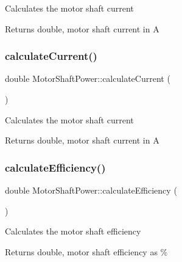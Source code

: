 Calculates the motor shaft current

\begin{DoxyReturn}{Returns}
double, motor shaft current in A 
\end{DoxyReturn}
\mbox{\label{class_motor_shaft_power_a3ce530d426fa14223199d89f54f34244}} 
\subsubsection{\texorpdfstring{calculate\+Current()}{calculateCurrent()}\hspace{0.1cm}{\footnotesize\ttfamily [3/3]}}
{\footnotesize\ttfamily double Motor\+Shaft\+Power\+::calculate\+Current (\begin{DoxyParamCaption}{ }\end{DoxyParamCaption})}

Calculates the motor shaft current

\begin{DoxyReturn}{Returns}
double, motor shaft current in A 
\end{DoxyReturn}
\mbox{\label{class_motor_shaft_power_ab7df0b41dc9d1bc6a591f0ab8f57b7ee}} 
\subsubsection{\texorpdfstring{calculate\+Efficiency()}{calculateEfficiency()}\hspace{0.1cm}{\footnotesize\ttfamily [1/3]}}
{\footnotesize\ttfamily double Motor\+Shaft\+Power\+::calculate\+Efficiency (\begin{DoxyParamCaption}{ }\end{DoxyParamCaption})}

Calculates the motor shaft efficiency

\begin{DoxyReturn}{Returns}
double, motor shaft efficiency as \% 
\end{DoxyReturn}
\mbox{\label{class_motor_shaft_power_ab7df0b41dc9d1bc6a591f0ab8f57b7ee}} 
